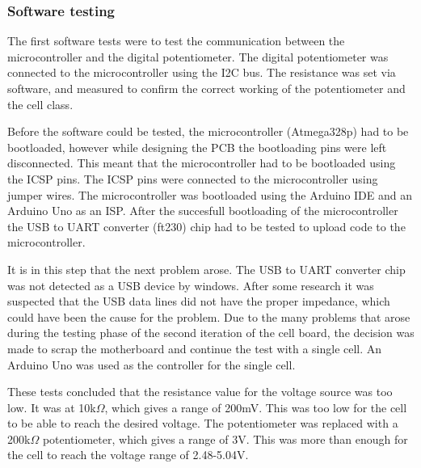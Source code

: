 \subsubsection{Software testing}
The first software tests were to test the communication between the microcontroller and the digital potentiometer. The digital potentiometer was connected to the microcontroller using the I2C bus. The resistance was set via software, and measured to confirm the correct working of the potentiometer and the cell class.

Before the software could be tested, the microcontroller (Atmega328p) had to be bootloaded, however while designing the PCB the bootloading pins were left disconnected. This meant that the microcontroller had to be bootloaded using the ICSP pins. The ICSP pins were connected to the microcontroller using jumper wires. The microcontroller was bootloaded using the Arduino IDE and an Arduino Uno as an ISP. After the succesfull bootloading of the microcontroller the USB to UART converter (ft230) chip had to be tested to upload code to the microcontroller. 

It is in this step that the next problem arose. The USB to UART converter chip was not detected as a USB device by windows. After some research it was suspected that the USB data lines did not have  the proper impedance, which could have been the cause for the problem. Due to the many problems that arose during the testing phase of the second iteration of the cell board, the decision was made to scrap the motherboard and continue  the test with a single cell. An Arduino Uno was used as the controller for the single cell.

These tests concluded that the resistance value for the voltage source was too low. It was at 10k$\Omega$, which gives a range of 200mV. This was too low for the cell to be able to reach the desired voltage. The potentiometer was replaced with a 200k$\Omega$ potentiometer, which gives a range of 3V. This was more than enough for the cell to reach the voltage range of 2.48-5.04V.